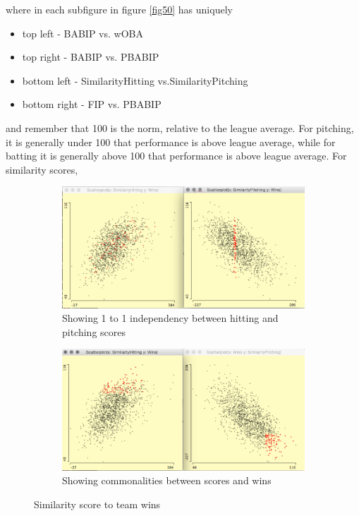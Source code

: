 \documentclass[12pt]{article}
\numberwithin{equation}{subsection}
\begin{document}
\noindent where in each subfigure in figure \ref{fig50} has uniquely
\begin{itemize}
	\item top left - BABIP vs. wOBA
    \item top right - BABIP vs. PBABIP
   	\item bottom left - SimilarityHitting vs.SimilarityPitching
    \item bottom right - FIP vs. PBABIP
\end{itemize}

\noindent and remember that 100 is the norm, relative to the league average. For pitching, it is generally under 100 that performance is above league average, while for batting it is generally above 100 that performance is above league average. For similarity scores, 

\begin{figure}[H] 
  \begin{subfigure}[b]{0.5\linewidth}
    \centering
    \includegraphics[width=0.9\linewidth]{similarity} 
    \captionsetup{justification=centering}
    \caption{Showing 1 to 1 independency between hitting and pitching scores}
    \label{fig2:a} 
    \vspace{4ex}
  \end{subfigure}%
  \begin{subfigure}[b]{0.5\linewidth}
    \centering
    \includegraphics[width=0.9\linewidth]{similarity2} 
    \captionsetup{justification=centering}
    \caption{Showing commonalities between scores and wins}
    \label{fig2:b} 
    \vspace{4ex}
  \end{subfigure} 
  \caption{Similarity score to team wins}
\end{figure}
\end{document}
